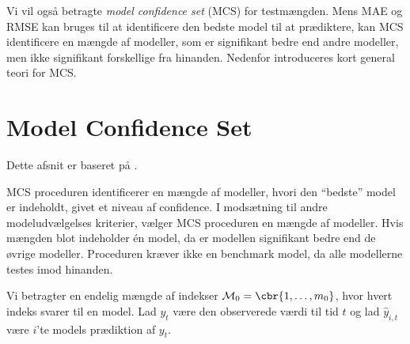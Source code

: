 Vi vil også betragte \textit{model confidence set} (MCS) for testmængden.
Mens MAE og RMSE kan bruges til at identificere den bedste model til at prædiktere, kan MCS identificere en mængde af modeller, som er signifikant bedre end andre modeller, men ikke signifikant forskellige fra hinanden.
Nedenfor introduceres kort general teori for MCS.

\section{Model Confidence Set}
Dette afsnit er baseret på \citep{mcs2011}.

MCS proceduren identificerer en mængde af modeller, hvori den ``bedste'' model er indeholdt, givet et niveau af confidence.
I modsætning til andre modeludvælgelses kriterier, vælger MCS proceduren en mængde af modeller.
Hvis mængden blot indeholder én model, da er modellen signifikant bedre end de øvrige modeller.
Proceduren kræver ikke en benchmark model, da alle modellerne testes imod hinanden.

Vi betragter en endelig mængde af indekser \(\mathcal{M}_0 = \cbr{1, \ldots, m_0}\), hvor hvert indeks svarer til en model.
Lad \(y_t\) være den observerede værdi til tid \(t\) og lad \(\widehat{y}_{i,t}\) være \(i\)'te models prædiktion af \(y_t\).  

